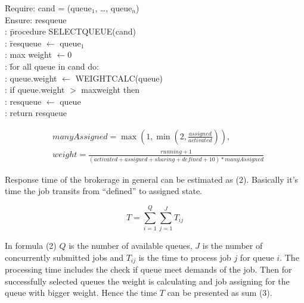 \begin{tabbing}
\hspace{0.5in}\=
     Require: cand = (queue$_1$, \ldots, queue$_n$) \\
  \> Ensure: res{\textunderscore}queue \\
  : \hspace{1em}\= procedure SELECT{\textunderscore}QUEUE(cand) \\
  :             \> \hspace{1em}\= res{\textunderscore}queue $\leftarrow$%
queue$_1$ \\
  :             \>             \> \hspace{0.1in} max{\textunderscore}%
weight $\leftarrow 0$ \\
  :             \> \hspace{1em}\= for all queue in cand do: \\
  :             \>             \> queue.weight $\leftarrow$ %
WEIGHT{\textunderscore}CALC(queue) \\
  :             \>             \> \hspace{1em} if queue.weight $>$ %
max{\textunderscore}weight then \\
  :             \>             \> \hspace{2em} res{\textunderscore}queue%
$\leftarrow$ queue \\
  :             \>             \> \hspace{0.5em} return %
res{\textunderscore}queue
\end{tabbing}

\begin{equation}
  \begin{aligned}
    & manyAssigned = \max(1, \min(2, \frac{assigned}{activated})), \\
    & weight = \frac{running + 1}{(activated + assigned + sharing + defined +
        10) * manyAssigned}
  \end{aligned}
\end{equation}

Response time of the brokerage in general can be estimated as (2). Basically it's time the job
transits from ``defined'' to assigned state.  

\begin{equation}
    T = \sum_{i = 1}^{Q} \sum_{j = 1}^{J} T_{ij}
\end{equation}

In formula (2) $Q$ is the number of available queues, $J$ is the number of
concurrently  submitted jobs and $T_{ij}$ is the time to process job $j$ for
queue $i$. The processing time includes the check if queue meet demands of the
job. Then for successfully selected queues the weight is calculating and job
assigning for the queue with bigger weight. Hence the time $T$ can be presented as sum (3).

